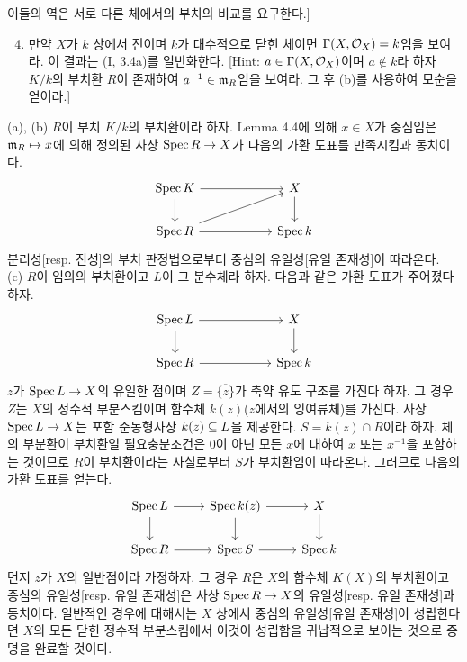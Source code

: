 \begin{enumerate}[label=\tb{4.\arabic*.},itemindent=0mm,itemsep=4mm]
\begin{enumerate}[label=*(\alph*)]
	이들의 역은 서로 다른 체에서의 부치의 비교를 요구한다.]
	\end{enumerate}
	\begin{enumerate}[label=(\alph*)]
	\setcounter{enumii}{3}
	\item 만약 $X$가 $k$ 상에서 진이며 $k$가 대수적으로 닫힌 체이면 $\Gamma(X,\mathcal{O}_X)=k$임을 보여라.
	이 결과는 (I, 3.4a)를 일반화한다. [Hint: $a\in\Gamma(X,\mathcal{O}_X)$이며 $a\notin k$라 하자
	$K/k$의 부치환 $R$이 존재하여 $a^{-1}\in\mathfrak{m}_R$임을 보여라. 그 후 (b)를 사용하여 모순을 얻어라.]
	\end{enumerate}
	\sol (a), (b) $R$이 부치 $K/k$의 부치환이라 하자.
	Lemma 4.4에 의해 $x\in X$가 중심임은 $\mathfrak{m}_R\mapsto x$에 의해 정의된 사상 $\operatorname{Spec} R\rightarrow X$가 다음의 가환 도표를 만족시킴과 동치이다.
	$$\begin{tikzcd}[column sep=2cm]\Spec K\arrow[d]\arrow[r]&X\arrow[d]\\\Spec R\arrow[r]\arrow[ur]&\Spec k\end{tikzcd}$$
	분리성[resp. 진성]의 부치 판정법으로부터 중심의 유일성[유일 존재성]이 따라온다.\\
	(c) $R$이 임의의 부치환이고 $L$이 그 분수체라 하자. 다음과 같은 가환 도표가 주어졌다 하자.
	$$\begin{tikzcd}[column sep=2cm]\Spec L\arrow[d]\arrow[r]&X\arrow[d]\\\Spec R\arrow[r]&\Spec k\end{tikzcd}$$
	$z$가 $\operatorname{Spec} L\rightarrow X$의 유일한 점이며 $Z=\overline{\{z\}}$가 축약 유도 구조를 가진다 하자.
	그 경우 $Z$는 $X$의 정수적 부분스킴이며 함수체 $k(z)$($z$에서의 잉여류체)를 가진다.
	사상 $\operatorname{Spec} L\rightarrow X$는 포함 준동형사상 $k(z)\subseteq L$을 제공한다. $S=k(z)\cap R$이라 하자.
	체의 부분환이 부치환일 필요충분조건은 0이 아닌 모든 $x$에 대하여 $x$ 또는 $x^{-1}$을 포함하는 것이므로
	$R$이 부치환이라는 사실로부터 $S$가 부치환임이 따라온다. 그러므로 다음의 가환 도표를 얻는다.
	$$\begin{tikzcd}\Spec L\arrow[d]\arrow[r]&\Spec k(z)\arrow[r]\arrow[d]&X\arrow[d]\\
	\Spec R\arrow[r]&\Spec S\arrow[r]&\Spec k\end{tikzcd}$$
	먼저 $z$가 $X$의 일반점이라 가정하자. 그 경우 $R$은 $X$의 함수체 $K(X)$의 부치환이고 중심의 유일성[resp. 유일 존재성]은
	사상 $\operatorname{Spec} R\rightarrow X$의 유일성[resp. 유일 존재성]과 동치이다.
	일반적인 경우에 대해서는 $X$ 상에서 중심의 유일성[유일 존재성]이 성립한다면
	$X$의 모든 닫힌 정수적 부분스킴에서 이것이 성립함을 귀납적으로 보이는 것으로 증명을 완료할 것이다.\\[2mm]

\end{enumerate}
